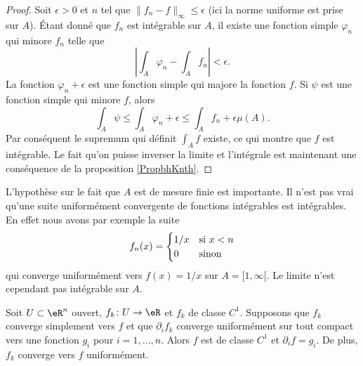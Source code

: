 \begin{proof}
    Soit \( \epsilon>0\) et \( n\) tel que \( \| f_n-f \|_{\infty}\leq \epsilon\) (ici la norme uniforme est prise sur \( A\)). Étant donné que \( f_n\) est intégrable sur \( A\), il existe une fonction simple \( \varphi_n\) qui minore \( f_n\) telle que
    \begin{equation}
        \left| \int_{A}\varphi_n-\int_A f_n \right| <\epsilon.
    \end{equation}
    La fonction \( \varphi_n+\epsilon\) est une fonction simple qui majore la fonction \( f\). Si \( \psi\) est une fonction simple qui minore \( f\), alors
    \begin{equation}
        \int_A\psi\leq\int_A\varphi_n+\epsilon\leq\int_A f_n+\epsilon\mu(A).
    \end{equation}
    Par conséquent le supremum qui définit \( \int_A f\) existe, ce qui montre que \( f\) est intégrable. Le fait qu'on puisse inverser la limite et l'intégrale est maintenant une conséquence de la proposition \ref{PropbhKnth}.
\end{proof}

\begin{remark}
    L'hypothèse sur le fait que \( A\) est de mesure finie est importante. Il n'est pas vrai qu'une suite uniformément convergente de fonctions intégrables est intégrables. En effet nous avons par exemple la suite
    \begin{equation}
        f_n(x)=\begin{cases}
            1/x    &   \text{si \( x<n\)}\\
            0    &    \text{sinon}
        \end{cases}
    \end{equation}
    qui converge uniformément vers \( f(x)=1/x\) sur \( A=\mathopen[ 1 , \infty [\). Le limite n'est cependant pas intégrable sur \( A\).
\end{remark}

\begin{theorem}[Page I.12]		\label{ThoSerUnifDerr}
	Soit $U\subset\eR^n$ ouvert, $f_k\colon U\to \eR$ et $f_k$ de classe $C^1$. Supposons que $f_k$ converge simplement vers $f$ et que $\partial_if_k$ converge uniformément sur tout compact  vers une fonction $g_i$ pour $i=1,\ldots,n$. Alors $f$ est de classe $C^1$ et $\partial_if=g_i$. De plus, $f_k$ converge vers $f$ uniformément.
\end{theorem}

